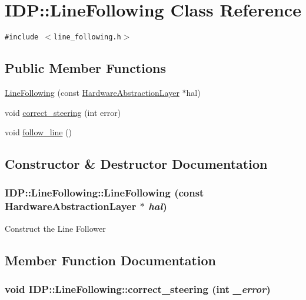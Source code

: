 \hypertarget{classIDP_1_1LineFollowing}{
\section{IDP::LineFollowing Class Reference}
\label{classIDP_1_1LineFollowing}
}
{\tt \#include $<$line\_\-following.h$>$}

\subsection*{Public Member Functions}
\begin{CompactItemize}
\item 
\hyperlink{classIDP_1_1LineFollowing_b30cde971719545d81ce253ae995cc4d}{LineFollowing} (const \hyperlink{classIDP_1_1HardwareAbstractionLayer}{HardwareAbstractionLayer} $\ast$hal)
\item 
void \hyperlink{classIDP_1_1LineFollowing_f578916c93854c701fccbdaef783997b}{correct\_\-steering} (int error)
\item 
void \hyperlink{classIDP_1_1LineFollowing_35c80e04729e98dfa927159610605649}{follow\_\-line} ()
\end{CompactItemize}


\subsection{Constructor \& Destructor Documentation}
\hypertarget{classIDP_1_1LineFollowing_b30cde971719545d81ce253ae995cc4d}{
\subsubsection[{LineFollowing}]{\setlength{\rightskip}{0pt plus 5cm}IDP::LineFollowing::LineFollowing (const {\bf HardwareAbstractionLayer} $\ast$ {\em hal})}}
\label{classIDP_1_1LineFollowing_b30cde971719545d81ce253ae995cc4d}


Construct the Line Follower 

\subsection{Member Function Documentation}
\hypertarget{classIDP_1_1LineFollowing_f578916c93854c701fccbdaef783997b}{
\subsubsection[{correct\_\-steering}]{\setlength{\rightskip}{0pt plus 5cm}void IDP::LineFollowing::correct\_\-steering (int {\em \_\-error})}}
\label{classIDP_1_1LineFollowing_f578916c93854c701fccbdaef783997b}


